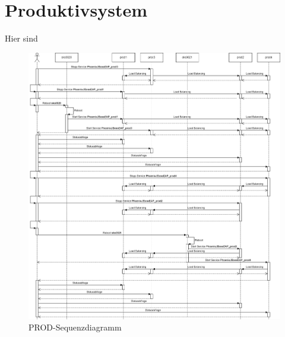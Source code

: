 
\chapter{Produktivsystem}
\begin{flushleft}
    Hier sind
    \begin{figure}[H]
        \centering
        \includegraphics[width=1\linewidth]{source/prod/sequenzdiagramm_prod}
        \caption{PROD-Sequenzdiagramm}
        \label{fig:prod-sequenzdiagramm}
    \end{figure}
\end{flushleft}